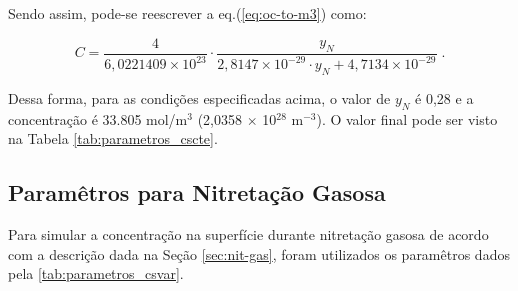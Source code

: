 Sendo assim, pode-se reescrever a eq.(\ref{eq:oc-to-m3}) como:

\begin{equation} \label{eq:oc-to-m3-full}
	C = \dfrac{4}{6,0221409 \times 10^{23}} \cdot \dfrac{y_N}{2,8147 \times 10^{-29} \cdot y_N + 4,7134 \times 10^{-29}}  \;.
\end{equation}

Dessa forma, para as condições especificadas acima, o valor de $y_N$ é 0,28 e a concentração é 33.805 mol/m$^3$ (2,0358 $\times$ 10$^{28}$ m$^{-3}$). O valor final pode ser visto na Tabela \ref{tab:parametros_cscte}.

\begin{table}[ht]
\centering
\setlength{\doublerulesep}{\arrayrulewidth}
{\def\arraystretch{2}\tabcolsep=10pt
\caption{Parâmetros para concentração na superfície constante}
}
\end{table}


\subsection{Paramêtros para Nitretação Gasosa}
\label{sec:param-gas}
Para simular a concentração na superfície durante nitretação gasosa de acordo com a descrição dada na Seção \autoref{sec:nit-gas}, foram utilizados os paramêtros dados pela \autoref{tab:parametros_csvar}.

\begin{table}[!htb]
\centering
\setlength{\doublerulesep}{\arrayrulewidth}
{\def\arraystretch{2}\tabcolsep=10pt
\caption{Parâmetros para concentração na superfície variável - nitretação gasosa}
}
\end{table}

